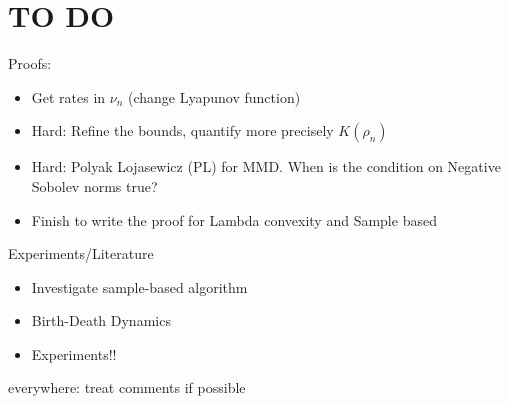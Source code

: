 
\section*{TO DO}

Proofs:
\begin{itemize}
	\item Get rates in $\nu_n$ (change Lyapunov function)
	\item Hard: Refine the bounds, quantify more precisely $K(\rho_n)$
	\item Hard: Polyak Lojasewicz (PL) for MMD. When is the condition on Negative Sobolev norms true?
	\item Finish to write the proof for Lambda convexity and Sample based
\end{itemize}


Experiments/Literature
\begin{itemize}
	\item Investigate sample-based algorithm
	\item Birth-Death Dynamics
	\item Experiments!!
\end{itemize}
everywhere: treat comments if possible
